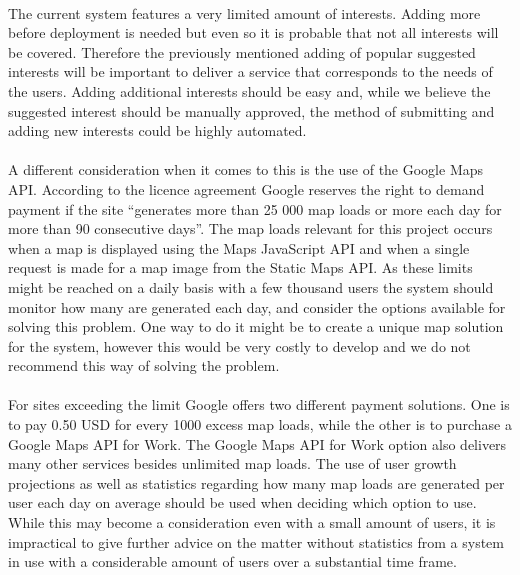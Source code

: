 \paragraph{} The current system features a very limited amount of interests. Adding more before deployment is needed but even so it is probable that not all interests will be covered. Therefore the previously mentioned adding of popular suggested interests will be important to deliver a service that corresponds to the needs of the users. Adding additional interests should be easy and, while we believe the suggested interest should be manually approved, the method of submitting and adding new interests could be highly automated.
\paragraph{} A different consideration when it comes to this is the use of the Google Maps API. According to the licence agreement Google reserves the right to demand payment if the site “generates more than 25 000 map loads or more each day for more than 90 consecutive days”. The map loads relevant for this project occurs when a map is displayed using the Maps JavaScript API and when a single request is made for a map image from the Static Maps API. As these limits might be reached on a daily basis with a few thousand users the system should monitor how many are generated each day, and consider the options available for solving this problem. One way to do it might be to create a unique map solution for the system, however this would be very costly to develop and we do not recommend this way of solving the problem.
\paragraph{} For sites exceeding the limit Google offers two different payment solutions. One is to pay 0.50 USD for every 1000 excess map loads, while the other is to purchase a Google Maps API for Work. The Google Maps API for Work option also delivers many other services besides unlimited map loads. The use of user growth projections as well as statistics regarding how many map loads are generated per user each day on average should be used when deciding which option to use. While this may become a consideration even with a small amount of users, it is impractical to give further advice on the matter without statistics from a system in use with a considerable amount of users over a substantial time frame. \cite{website:maps-api-docs-usage,website:maps-api-faq}

